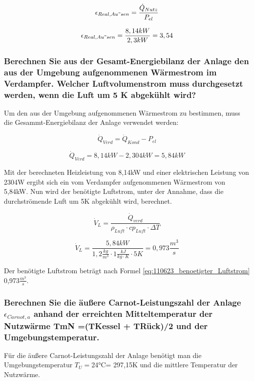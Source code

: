 \begin{equation}
\epsilon_{Real,Au"sen} = \frac{\dot Q_{Nutz}}{P_{el}}
\label{eq:110623_aeußere Leistungszahl_tatsächlich}
\end{equation}

$$ \epsilon_{Real,Au"sen} = \frac{8,14 kW}{2,3 kW} = 3,54$$

\subsubsection{Berechnen Sie aus der Gesamt-Energiebilanz der Anlage den aus der Umgebung aufgenommenen Wärmestrom im Verdampfer.
Welcher Luftvolumenstrom muss durchgesetzt werden, wenn die Luft um 5 K abgekühlt wird?}
Um den aus der Umgebung aufgenommenen Wärmestrom zu bestimmen, muss die Gesammt-Energiebilanz der Anlage verwendet werden:

\begin{equation}
\dot Q_{Verd}=\dot Q_{Kond}-P_{el}
\label{eq:110623_aeußere Leistungszahl}
\end{equation}

$$\dot Q_{Verd}= 8,14 kW-2,304 kW= 5,84kW $$


Mit der berechneten Heizleistung von 8,14kW und einer elektrischen Leistung von 2304W ergibt sich ein vom Verdampfer aufgenommenen Wärmestrom von 5,84kW. Nun wird der benötigte Luftstrom, unter der Annahme, dass die durchströmende Luft um 5K abgekühlt wird, berechnet.

\begin{equation}
\dot V_{L}=\frac{\dot Q_{verd}}{\rho_{Luft} \cdot cp_{Luft} \cdot \Delta T}
\label{eq:110623_benoetigter_Luftstrom}
\end{equation}

$$\dot V_{L}=\frac{5,84 kW}{ 1,2 \frac{kg}{m^3} \cdot 1 \frac{kJ}{kg \cdot K} \cdot 5K}= 0,973 \frac{m^3}{s}$$


Der benötigte Luftstrom beträgt nach Formel \ref{eq:110623_benoetigter_Luftstrom} 0,973$\frac{m^3}{s}$. 
\subsubsection{Berechnen Sie die äußere Carnot-Leistungszahl der Anlage \texorpdfstring{$\epsilon_{Carnot,a}$}{} anhand der erreichten Mitteltemperatur der Nutzwärme TmN =(TKessel + TRück)/2 und der Umgebungstemperatur.}
Für die äußere Carnot-Leistungszahl der Anlage benötigt man die Umgebungstemperatur $T_{U}=$24°C= 297,15K und die mittlere Temperatur der Nutzwärme.


